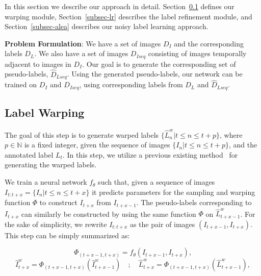 
In this section we describe our approach in detail. Section~\ref{subsec-lw} defines our warping module, Section~\ref{subsec-lr} describes the label refinement module, and Section~\ref{subsec-alea} describes our noisy label learning approach.


\textbf{Problem Formulation}: We have a set of images $D_{I}$ and the corresponding labels $D_{L}$. We also have a set of images $D_{Iseq}$ consisting of images temporally adjacent to images in $D_{I}$. 
Our goal is to generate the corresponding set of pseudo-labels, $\hat{D}_{Lseq}$. Using the generated pseudo-labels, our network can be trained on $D_{I}$ and $D_{Iseq}$, using corresponding labels from $D_{L}$ and $\hat{D}_{Lseq}$.

\subsection{Label Warping}
\label{subsec-lw}
The goal of this step is to generate warped labels $ \{\hat{L}^{w}_{n} | t\leq n \leq t + p\}$, where $p \in \mathbb{N}$ is a fixed integer, given the sequence of images $\{I_{n}| t\leq n \leq t + p\}$, and the annotated label $L_{t}$. In this step, we utilize a previous existing method~\cite{nvidia_cvpr19} for generating the warped labels. %

We train a neural network $f_{\theta}$ such that, given a sequence of images $I_{t:t+x} = \{I_{n}| t\leq n \leq t + x\}$ it predicts parameters for the sampling and warping function $ \Phi$ to construct $I_{t+x}$ from $I_{t + x -1}$.
The pseudo-labels corresponding to $I_{t+x}$ can similarly be constructed by using the same function $\Phi$ on $\hat{L}^{w}_{t+x-1}$. For the sake of simplicity, we rewrite $I_{t:t+x}$ as the pair of images $(I_{t+x-1},I_{t+x})$. This step can be simply summarized as:

\begin{equation}
\label{eq-warp_gen}
    \Phi_{(t+x-1, t+x)} = f_\theta (I_{t+x-1}, I_{t+x}),
\end{equation}
\begin{equation}
\label{eq-warp_both}
    \hat{I}^{w}_{t+x} = \Phi_{(t+x-1, t+x)} ( \hat{I}^{w}_{t+x-1}) \quad;\quad \hat{L}^{w}_{t+x} = \Phi_{(t+x-1, t+x)} ( \hat{L}^{w}_{t+x-1}),
\end{equation}

